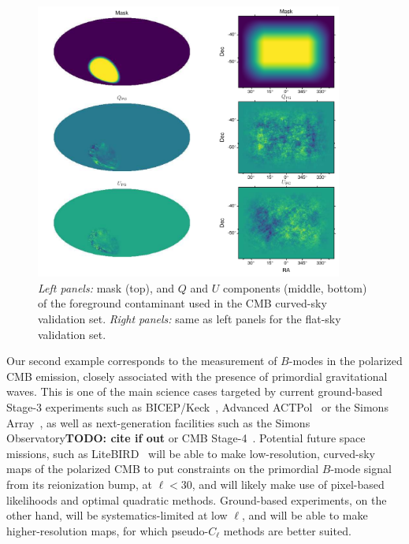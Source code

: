 \documentclass[usenatbib]{mnrasb}
\newcommand{\todo}[1]{{\bf TODO: #1}}
\newcommand{\todo}[1]{}
\begin{document}
        \begin{figure}
          \centering
          \includegraphics[width=0.9\textwidth]{maps_cmb}
          \caption{{\sl Left panels:} mask (top), and $Q$ and $U$ components (middle, bottom) of the foreground contaminant used in the CMB curved-sky validation set. {\sl Right panels:} same as left panels for the flat-sky validation set.}
          \label{fig:cmb_mocks}
        \end{figure}
        Our second example corresponds to the measurement of $B$-modes in the polarized CMB emission, closely associated with the presence of primordial gravitational waves. This is one of the main science cases targeted by current ground-based Stage-3 experiments such as BICEP/Keck~\citep{2016PhRvL.116c1302B}, Advanced ACTPol~\citep{2016SPIE.9910E..14D,2017JCAP...06..031L} or the Simons Array~\citep{2016JLTP..184..805S,2017ApJ...848..121P}, as well as next-generation facilities such as the Simons Observatory\todo{cite if out} or CMB Stage-4~\citep{2016arXiv161002743A}. Potential future space missions, such as LiteBIRD~\citep{2018JLTP..tmp..124S} will be able to make low-resolution, curved-sky maps of the polarized CMB to put constraints on the primordial $B$-mode signal from its reionization bump, at $\ell<30$, and will likely make use of pixel-based likelihoods and optimal quadratic methods. Ground-based experiments, on the other hand, will be systematics-limited at low $\ell$, and will be able to make higher-resolution maps, for which pseudo-$C_\ell$ methods are better suited.
        
\end{document}
